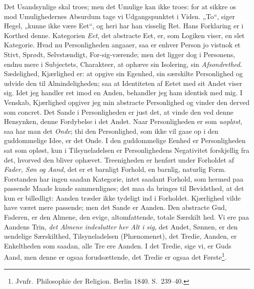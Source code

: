 \documentclass[12pt]{book}
\begin{document}
Det Usandsynlige skal troes; men det Umulige kan ikke troes: for at
sikkre os mod Umulighedernes Absurdum tage vi Udgangspunktet i
Viden. „To“, siger Hegel, „kunne ikke være Eet“, og heri har han
visselig Ret. Hans Forklaring er i Korthed denne. Kategorien
\emph{Eet}, det abstracte Eet, er, som Logiken viser, en slet
Kategorie. Hvad nu Personligheden angaaer, saa er enhver Person jo
vistnok et Stivt, Sprødt, Selvstændigt, For-sig-værende; men det
ligger dog i Personens, endnu mere i Subjectets, Charakteer, at
ophæve sin Isolering, sin \emph{Afsondrethed}. Sædelighed,
Kjærlighed er: at opgive sin Egenhed, sin særskilte Personlighed og
udvide den til Almindeligheden; saa at Identiteten af Eetet med sit
Andet viser sig. Idet jeg handler ret imod en Anden, behandler jeg
ham identisk med mig. I Venskab, Kjærlighed opgiver jeg min
abstracte Personlighed og vinder den derved som concret. Det Sande i
Personligheden er just det, at vinde den ved denne Hensynken, denne
Fordybelse i det Andet. Naar Personligheden er som \emph{uopløst},
saa har man det \emph{Onde}; thi den Personlighed, som ikke vil gaae
op i den guddommelige Idee, er det Onde. I den guddommelige Eenhed
er Personligheden sat som opløst, kun i Tilsyneladelsen er
Personlighedens Negativitet forskjellig fra det, hvorved den bliver
ophævet. Treenigheden er henført under Forholdet af \emph{Fader, Søn
og Aand}, det er et barnligt Forhold, en barnlig, naturlig Form.
Forstanden har ingen saadan Kategorie, intet saadant Forhold, som
hermed paa passende Maade kunde sammenlignes; det maa da bringes til
Bevidsthed, at det kun er billedligt: Aanden træder ikke tydeligt
ind i Forholdet. Kjærlighed vilde have været mere passende; men det
Sande er Aanden. Den abstracte Gud, Faderen, er den Almene, den
evige, altomfattende, totale Særskilt\-
hed. Vi ere paa Aandens Trin, \emph{det Almene indeslutter her Alt i
sig}, det Andet, Sønnen, er den uendelige Særskilthed,
Tilsyneladelsen (Phænomenet), det Tredie, Aanden, er Enkeltheden som
saadan, alle Tre ere Aanden. I det Tredie, sige vi, er Guds Aand,
men denne er ogsaa forudsættende, det Tredie er ogsaa det
Første\footnote{Jvnfr.\ Philosophie der Religion. Berlin 1840.
S.\ 239--40.}.
\end{document}
